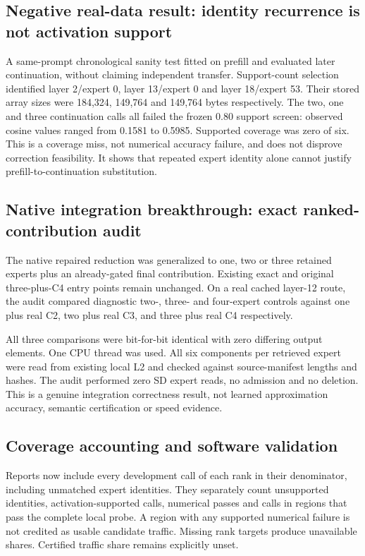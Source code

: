 \subsection{Negative real-data result: identity recurrence is not activation support}
A same-prompt chronological sanity test fitted on prefill and evaluated later
continuation, without claiming independent transfer. Support-count selection
identified layer 2/expert 0, layer 13/expert 0 and layer 18/expert 53. Their
stored array sizes were 184,324, 149,764 and 149,764 bytes respectively.
The two, one and three continuation calls all failed the frozen 0.80 support
screen: observed cosine values ranged from 0.1581 to 0.5985. Supported coverage
was zero of six. This is a coverage miss, not numerical accuracy failure,
and does not disprove correction feasibility. It shows that repeated expert
identity alone cannot justify prefill-to-continuation substitution.

\subsection{Native integration breakthrough: exact ranked-contribution audit}
The native repaired reduction was generalized to one, two or three retained
experts plus an already-gated final contribution. Existing exact and original
three-plus-C4 entry points remain unchanged. On a real cached layer-12 route,
the audit compared diagnostic two-, three- and four-expert controls against
one plus real C2, two plus real C3, and three plus real C4 respectively.

All three comparisons were bit-for-bit identical with zero differing output
elements. One CPU thread was used. All six components per retrieved expert
were read from existing local L2 and checked against source-manifest lengths
and hashes. The audit performed zero SD expert reads, no admission and no
deletion. This is a genuine integration correctness result, not learned
approximation accuracy, semantic certification or speed evidence.

\subsection{Coverage accounting and software validation}
Reports now include every development call of each rank in their denominator,
including unmatched expert identities. They separately count unsupported
identities, activation-supported calls, numerical passes and calls in regions
that pass the complete local probe. A region with any supported numerical
failure is not credited as usable candidate traffic. Missing rank targets
produce unavailable shares. Certified traffic share remains explicitly unset.


